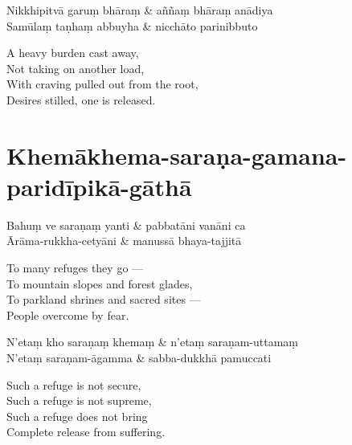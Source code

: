 \begin{twochants}
Nikkhipitvā garuṃ bhāraṃ & aññaṃ bhāraṃ anādiya \\
Samūlaṃ taṇhaṃ abbuyha & nicchāto parinibbuto \\
\end{twochants}

\begin{english}
  A heavy burden cast away,\\
  Not taking on another load,\\
  With craving pulled out from the root,\\
  Desires stilled, one is released.
\end{english}


\clearpage

\section{Khemākhema-saraṇa-gamana-paridīpikā-gāthā}



\begin{twochants}
Bahuṃ ve saraṇaṃ yanti & pabbatāni vanāni ca\\
Ārāma-rukkha-cetyāni & manussā bhaya-tajjitā\\
\end{twochants}

\begin{english}
  To many refuges they go ---\\
  To mountain slopes and forest glades,\\
  To parkland shrines and sacred sites ---\\
  People overcome by fear.
\end{english}

\begin{twochants}
N'etaṃ kho saraṇaṃ khemaṃ & n'etaṃ saraṇam-uttamaṃ\\
N'etaṃ saraṇam-āgamma & sabba-dukkhā pamuccati\\
\end{twochants}

\begin{english}
  Such a refuge is not secure,\\
  Such a refuge is not supreme,\\
  Such a refuge does not bring\\
  Complete release from suffering.
\end{english}

